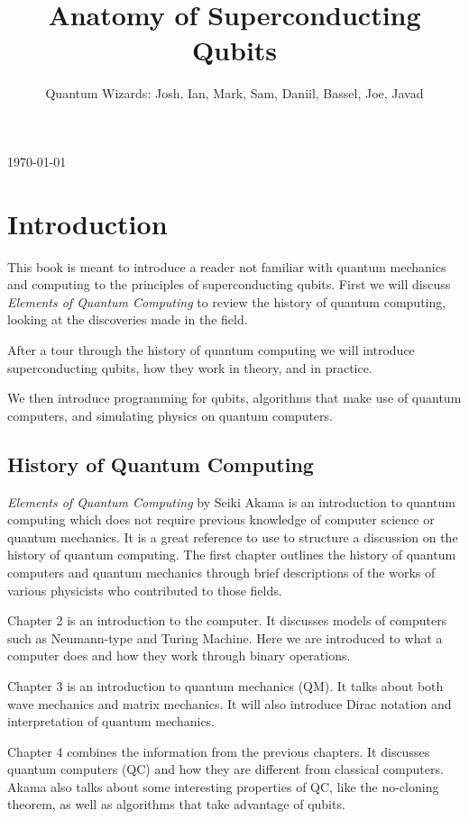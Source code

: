 \documentclass[conf]{new-aiaa}
\title{Anatomy of Superconducting Qubits}
\author{Quantum Wizards: Josh, Ian, Mark, Sam, Daniil, Bassel, Joe, Javad}
\begin{document}
\today
\maketitle

\section{Introduction}
This book is meant to introduce a reader not familiar with quantum mechanics and computing to the principles of superconducting qubits. First we will discuss \textit{Elements of Quantum Computing} to review the history of quantum computing, looking at the discoveries made in the field. \cite{akama2015elements}

After a tour through the history of quantum computing we will introduce superconducting qubits, how they work in theory, and in practice.

We then introduce programming for qubits, algorithms that make use of quantum computers, and simulating physics on quantum computers.

\subsection{History of Quantum Computing}

\textit{Elements of Quantum Computing} by Seiki Akama is an introduction to quantum computing which does not require previous knowledge of computer science or quantum mechanics. It is a great reference to use to structure a discussion on the history of quantum computing. The first chapter outlines the history of quantum computers and quantum mechanics through brief descriptions of the works of various physicists who contributed to those fields.

Chapter 2 is an introduction to the computer. It discusses models of computers such as Neumann-type and Turing Machine. Here we are introduced to what a computer does and how they work through binary operations.

Chapter 3 is an introduction to quantum mechanics (QM). It talks about both wave mechanics and matrix mechanics. It will also introduce Dirac notation and interpretation of quantum mechanics. 

Chapter 4 combines the information from the previous chapters. It discusses quantum computers (QC) and how they are different from classical computers. Akama also talks about some interesting properties of QC, like the no-cloning theorem, as well as algorithms that take advantage of qubits.
\end{document}
